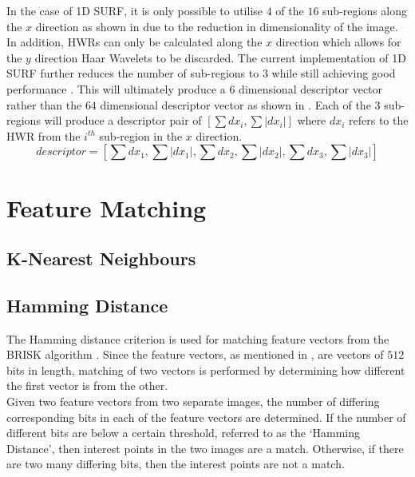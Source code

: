 \documentclass{article}
\begin{document}
In the case of 1D SURF, it is only possible to utilise $4$ of the $16$ sub-regions along the $x$ direction as shown in  due to the reduction in dimensionality of the image. In addition, HWRs can only be calculated along the $x$ direction which allows for the $y$ direction Haar Wavelets to be discarded. The current implementation of 1D SURF further reduces the number of sub-regions to $3$ while still achieving good performance \cite{Anderson}. This will ultimately produce a $6$ dimensional descriptor vector rather than the $64$ dimensional descriptor vector as shown in . Each of the $3$ sub-regions will produce a descriptor pair of $[\sum dx_i, \sum |dx_i|]$ where $dx_i$ refers to the HWR from the $i^{th}$ sub-region in the $x$ direction. \\

\begin{equation}
descriptor = [ \sum dx_1, \sum |dx_1|,\sum dx_2, \sum |dx_2|,\sum dx_3, \sum |dx_3|] 
\label{eqn:descriptor1d}
\end{equation}

\section{Feature Matching}
\label{sec:matching}

\subsection{K-Nearest Neighbours}
\label{sec:knn}

\subsection{Hamming Distance}
\label{sec:hamming}
The Hamming distance criterion is used for matching feature vectors from the BRISK algorithm \cite{Leutenegger2011}. Since the feature vectors, as mentioned in , are vectors of $512$ bits in length, matching of two vectors is performed by determining how different the first vector is from the other.\\

Given two feature vectors from two separate images, the number of differing corresponding bits in each of the feature vectors are determined. If the number of different bits are below a certain threshold, referred to as the `Hamming Distance', then interest points in the two images are a match. Otherwise, if there are two many differing bits, then the interest points are not a match.\\
\end{document}
